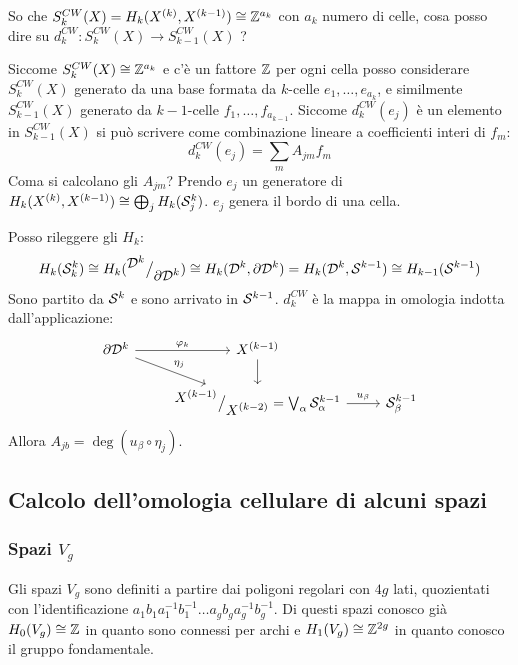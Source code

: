\begin{osservation}
  So che $ S_k^{CW}(X) = H_k(X^{(k)}, X^{(k-1)}) \cong \mathbb{Z}^{a_k} $ con $ a_k $ numero di celle,
  cosa posso dire su $ d_k^{CW} \colon S_k^{CW}(X) \to S_{k-1}^{CW}(X) $ ?

  Siccome $ S_k^{CW}(X) \cong \mathbb{Z}^{a_k} $ e c'è un fattore $ \mathbb{Z} $ per ogni cella
  posso considerare $ S_k^{CW}(X) $ generato da una base formata da
  $ k $-celle $ e_1, \dots, e_{a_k} $, e similmente $ S_{k-1}^{CW}(X) $ generato
  da $ k - 1 $-celle $ f_1, \dots, f_{a_{k-1}} $. Siccome $ d_k^{CW}(e_j) $ è un elemento in
  $ S_{k-1}^{CW}(X) $ si può scrivere come combinazione lineare a coefficienti interi di $ f_m $:
  \[
    d^{CW}_k (e_j) = \sum_m A_{jm}f_m
  \]
  Coma si calcolano gli $ A_{jm} $?
  Prendo $ e_j $ un generatore di $ H_k(X^{(k)}, X^{(k-1)}) \cong \bigoplus_j H_k(\mathcal{S}^{k}_j) $.
  $ e_j $ genera il bordo di una cella.

  Posso rileggere gli $ H_k $:
  \[
    H_k(\mathcal{S}^{k}_k) \cong H_k({^{\textstyle \mathcal{D}^{k}}\big/_{\textstyle \partial \mathcal{D}^{k}}}) \cong H_k(\mathcal{D}^{k}, \partial \mathcal{D}^{k}) =
    H_k(\mathcal{D}^{k}, \mathcal{S}^{k-1}) \cong H_{k-1}(\mathcal{S}^{k-1})
  \]
  Sono partito da $ \mathcal{S}^{k} $ e sono arrivato in $ \mathcal{S}^{k-1} $.
  $ d_k^{CW} $ è la mappa in omologia indotta dall'applicazione:
  \[
    \begin{tikzcd}
      \partial \Disk{k} \rar{\phi_k} \arrow{dr}{\eta_j} & X^{(k-1)} \dar & {}\\
      {} & \quot{X^{(k-1)}}{X^{(k-2)}} = \bigvee_\alpha \Sph{k-1}_\alpha \rar{u_\beta} & \Sph{k-1}_\beta
    \end{tikzcd}
  \]
  Allora $ A_{jb} = \deg{(u_\beta \circ \eta_j)} $.
\end{osservation}


\subsection{Calcolo dell'omologia cellulare di alcuni spazi}

\subsubsection{Spazi $ V_g $}

Gli spazi $ V_g $ sono definiti a partire dai poligoni
regolari con $ 4g $ lati, quozientati con l'identificazione
$ a_1 b_1 a_1^{-1} b_1^{-1} \dots a_g b_g a_g^{-1} b_g^{-1} $.
Di questi spazi conosco già $ H_0(V_g) \cong \mathbb{Z} $ in quanto
sono connessi per archi e $ H_1(V_g) \cong \mathbb{Z}^{2g} $ in quanto
conosco il gruppo fondamentale.

